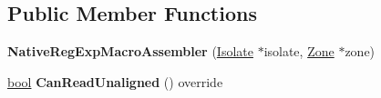 \subsection*{Public Member Functions}
\begin{DoxyCompactItemize}
\item 
\mbox{\label{classv8_1_1internal_1_1NativeRegExpMacroAssembler_ad358daf117f249b9ae056f175def4b9d}} 
{\bfseries Native\+Reg\+Exp\+Macro\+Assembler} (\mbox{\hyperlink{classv8_1_1internal_1_1Isolate}{Isolate}} $\ast$isolate, \mbox{\hyperlink{classv8_1_1internal_1_1Zone}{Zone}} $\ast$zone)
\item 
\mbox{\label{classv8_1_1internal_1_1NativeRegExpMacroAssembler_a346b8a739bb4d9161c396544757b884e}} 
\mbox{\hyperlink{classbool}{bool}} {\bfseries Can\+Read\+Unaligned} () override
\end{DoxyCompactItemize}

